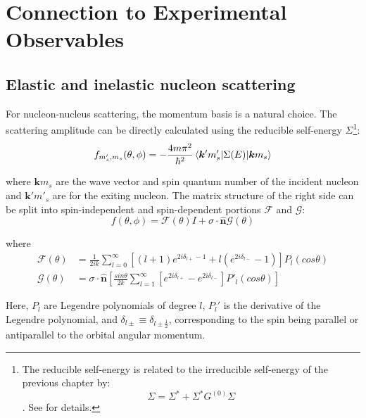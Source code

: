 \section{Connection to Experimental Observables}

\subsection{Elastic and inelastic nucleon scattering}
For nucleon-nucleus scattering, the momentum basis is a natural choice. The scattering amplitude can be directly calculated using the
reducible self-energy $\Sigma$\footnote{The reducible self-energy is related to the irreducible
    self-energy of the previous chapter by:
    \begin{equation}
        \Sigma = \Sigma^{*} + \Sigma^{*}G^{(0)}\Sigma
    \end{equation}. See \cite{MahzoonPhDThesis} for details.}:
\begin{equation}
    f_{m'_{s},m_{s}}(\theta,\phi) =
    -\frac{4m\pi^{2}}{\hbar^{2}}\braket{\bm{k}'m'_{s}|\Sigma(E)|\bm{k}m_{s}}
\end{equation}

\noindent
where $\bm{k}m_{s}$ are the wave vector and spin quantum number of the incident nucleon and
$\bm{k'}m'_{s}$ are for the exiting nucleon. The matrix structure of the right side can be
split into spin-independent and spin-dependent portions $\mathcal{F}$ and $\mathcal{G}$:
\begin{equation}
    f(\theta,\phi) = \mathcal{F}(\theta)I + \sigma\cdot\bm{\hat{n}}\mathcal{G}(\theta)
\end{equation}

\noindent
where
\begin{equation}
    \begin{split}
        \mathcal{F}(\theta) & = \frac{1}{2ik}\sum_{l=0}^{\infty}\left[(l+1)e^{2i\delta_{l+} - 1} +
        l\left(e^{2i\delta_{l-}}-1\right)\right]P_{l}(cos\theta)\\
        \mathcal{G}(\theta) & =
        \sigma\cdot\bm{\hat{n}}\left[\frac{sin\theta}{2k}\sum_{l=1}^{\infty}[e^{2i\delta_{l+}}-e^{2i\delta_{l-}}]P'_{l}(cos\theta)\right]
    \end{split}
\end{equation}

\noindent
Here, $P_{l}$ are Legendre polynomials of degree $l$, $P_{l}'$ is the derivative of the Legendre
polynomial, and $\delta_{l\pm} \equiv \delta_{l\pm\frac{1}{2}}$, corresponding to the spin being
parallel or antiparallel to the orbital angular momentum.

